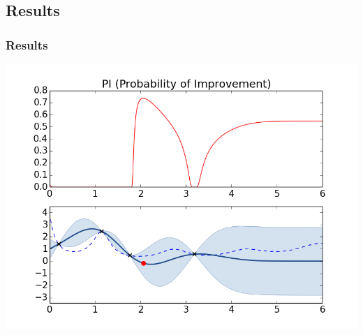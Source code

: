 \documentclass[10pt,handout]{beamer}
\begin{document}

\subsection{Results}

\begin{frame}
\frametitle{Results}
\includegraphics[width=\textwidth]{PI.png}
\end{frame}
\end{document}

